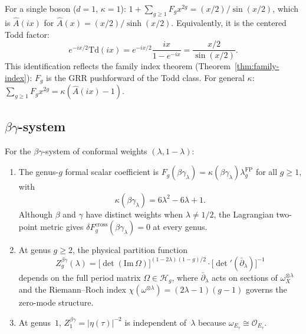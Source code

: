\begin{remark}
For a single boson ($d=1$, $\kappa=1$):
$1 + \sum_{g \geq 1} F_g x^{2g} = (x/2)/\sin(x/2)$,
which is $\hat{A}(ix)$ for
$\hat{A}(x)=(x/2)/\sinh(x/2)$. Equivalently, it is the centered
Todd factor:
\begin{equation}
e^{-ix/2}\mathrm{Td}(ix)
= e^{-ix/2}\frac{ix}{1-e^{-ix}}
= \frac{x/2}{\sin(x/2)}.
\end{equation}
This identification reflects the family index theorem
(Theorem~\ref{thm:family-index}): $F_g$ is the GRR pushforward
of the Todd class. For general $\kappa$:
$\sum_{g\geq1} F_g x^{2g}
=\kappa(\hat{A}(ix)-1)$.
\end{remark}

\subsection{\texorpdfstring{$\beta\gamma$-system}{beta-gamma system}}\label{subsec:betagamma-all-genera}

\begin{proposition}
For the $\beta\gamma$-system of conformal weights
$(\lambda, 1-\lambda)$:
\begin{enumerate}[label=\textup{(\roman*)}]
\item The genus-$g$ formal scalar coefficient is
$F_g(\beta\gamma_\lambda) = \kappa(\beta\gamma_\lambda)
\lambda_g^{\mathrm{FP}}$ for all $g\geq 1$, with
\[
\kappa(\beta\gamma_\lambda)=6\lambda^2-6\lambda+1.
\]
Although $\beta$ and $\gamma$ have distinct weights when
$\lambda\neq 1/2$, the Lagrangian two-point metric gives
$\delta F_g^{\mathrm{cross}}(\beta\gamma_\lambda)=0$
at every genus.
\item At genus $g \geq 2$, the physical partition function
\begin{equation}Z_g^{\beta\gamma}(\lambda) =
\bigl[\det(\mathrm{Im}\,\Omega)\bigr]^{(1-2\lambda)(1-g)/2}
\cdot \bigl[\det'(\bar{\partial}_\lambda)\bigr]^{-1}
\end{equation}
depends on the full period matrix
$\Omega \in \mathcal{H}_g$, where
$\bar{\partial}_\lambda$ acts on sections of
$\omega_X^{\otimes \lambda}$ and the Riemann--Roch
index $\chi(\omega^{\otimes \lambda}) =
(2\lambda-1)(g-1)$ governs the zero-mode structure.
\item At genus~$1$, $Z_1^{\beta\gamma} =
|\eta(\tau)|^{-2}$ is independent of~$\lambda$
because $\omega_{E_\tau} \cong \mathcal{O}_{E_\tau}$.
\end{enumerate}
\end{proposition}

